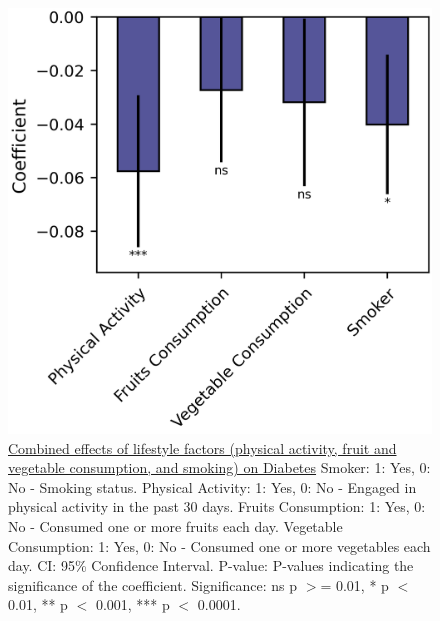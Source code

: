 \documentclass[11pt]{article}
\begin{document}
\begin{figure}[htbp]
\centering
\includegraphics{df_lifestyle_combined_formatted.png}
\caption{\protect\hyperlink{file-df-lifestyle-combined-pkl}{Combined effects of lifestyle factors (physical activity, fruit and vegetable consumption, and smoking) on Diabetes}
Smoker: 1: Yes, 0: No - Smoking status. 
Physical Activity: 1: Yes, 0: No - Engaged in physical activity in the past 30 days. 
Fruits Consumption: 1: Yes, 0: No - Consumed one or more fruits each day. 
Vegetable Consumption: 1: Yes, 0: No - Consumed one or more vegetables each day. 
CI: 95\% Confidence Interval. 
P-value: P-values indicating the significance of the coefficient. 
Significance: ns p $>$= 0.01, * p $<$ 0.01, ** p $<$ 0.001, *** p $<$ 0.0001.}
\label{figure:df-lifestyle-combined-formatted}
\end{figure}
% 
% 
% 
% 
% 
% 
\end{document}
